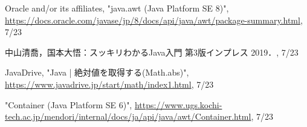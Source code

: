 \documentclass[a4j,12pt]{jsarticle}
\begin{document}

\begin{thebibliography}{99}

 Oracle and/or its affiliates, "java.awt (Java Platform SE 8)", \url{https://docs.oracle.com/javase/jp/8/docs/api/java/awt/package-summary.html}, 7/23

 中山清喬，国本大悟：スッキリわかるJava入門 第3版インプレス 2019．, 7/23

 JavaDrive, "Java | 絶対値を取得する(Math.abs)", \url{https://www.javadrive.jp/start/math/index1.html}, 7/23

 "Container (Java Platform SE 6)", \url{https://www.ugs.kochi-tech.ac.jp/mendori/internal/docs/ja/api/java/awt/Container.html}, 7/23





\end{thebibliography}
\end{document}
